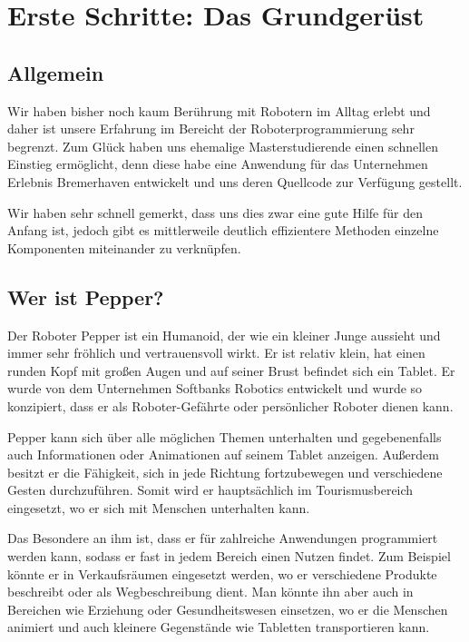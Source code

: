 \newcommand{\chaptergrundgeruest}{Kapitel 3. }

\chapter{Erste Schritte: Das Grundgerüst}
\label{sec:erste-schritte-und-installation}
\lhead{\chaptergrundgeruest \emph{Erste Schritte: Das Grundgerüst}}

\section{Allgemein}
Wir haben bisher noch kaum Berührung mit Robotern im Alltag erlebt und daher ist unsere Erfahrung im Bereicht
der Roboterprogrammierung sehr begrenzt. Zum Glück haben uns ehemalige Masterstudierende einen schnellen
Einstieg ermöglicht, denn diese habe eine Anwendung für das Unternehmen \grqq{}Erlebnis Bremerhaven\grqq{}
entwickelt und uns deren Quellcode zur Verfügung gestellt.

Wir haben sehr schnell gemerkt, dass uns dies zwar eine gute Hilfe für den Anfang ist, jedoch gibt es mittlerweile
deutlich effizientere Methoden einzelne Komponenten miteinander zu verknüpfen.\\

\section{Wer ist Pepper?}

Der Roboter Pepper ist ein Humanoid, der wie ein kleiner Junge aussieht und immer sehr fröhlich und vertrauensvoll wirkt. Er ist relativ klein, hat einen runden Kopf mit großen Augen und auf seiner Brust befindet sich ein Tablet. Er wurde von dem Unternehmen Softbanks Robotics entwickelt und wurde so konzipiert, dass er als Roboter-Gefährte oder persönlicher Roboter dienen kann. 

Pepper kann sich über alle möglichen Themen unterhalten und gegebenenfalls auch Informationen oder Animationen auf seinem Tablet anzeigen. Außerdem besitzt er die Fähigkeit, sich in jede Richtung fortzubewegen und verschiedene Gesten durchzuführen. Somit wird er hauptsächlich im Tourismusbereich eingesetzt, wo er sich mit Menschen unterhalten kann. 

Das Besondere an ihm ist, dass er für zahlreiche Anwendungen programmiert werden kann, sodass er fast in jedem Bereich einen Nutzen findet. Zum Beispiel könnte er in Verkaufsräumen eingesetzt werden, wo er verschiedene Produkte beschreibt oder als Wegbeschreibung dient. Man könnte ihn aber auch in Bereichen wie Erziehung oder Gesundheitswesen einsetzen, wo er die Menschen animiert und auch kleinere Gegenstände wie Tabletten transportieren kann. 

